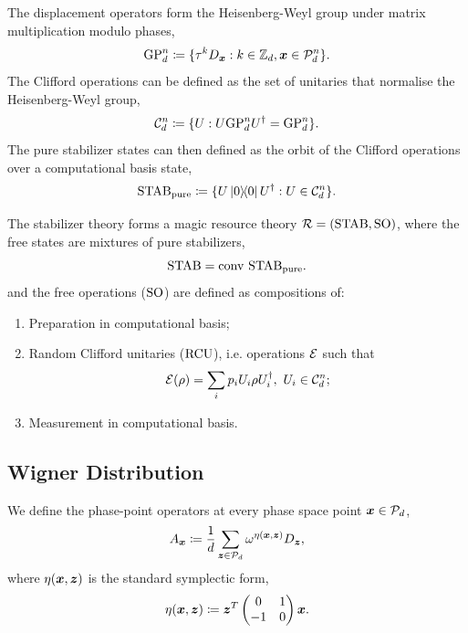 \documentclass[pra,
aps,
twocolumn,
superscriptaddress,
groupedaddress,
nofootinbib,
reprint
]{revtex4-1}
\begin{document}
The displacement operators form the Heisenberg-Weyl group  under matrix multiplication modulo phases,
\begin{equation}\label{eq:gp}
    {\rm{GP}}_d^n \coloneqq \{ \tau^k D_{\bmx}: k \in \mathbb{Z}_d, \bmx \in \cal{P}_d^n\}.
\end{equation}
The Clifford operations can be defined as the set of unitaries that normalise the Heisenberg-Weyl group,
\begin{equation}
    \cal{C}_d^n \coloneqq \{ U: U {\rm{GP}}_d^n U^\dagger = {\rm{GP}}_d^n \}.
\end{equation}
The pure stabilizer states can then defined as the orbit of the Clifford operations over a computational basis state,
\begin{equation}\label{eq:stab}
    \stab_{{\rm{pure}}} \coloneqq \{ U\ketbra{0}{0}U^\dagger: U \in \cal{C}_d^n\}.
\end{equation}

The stabilizer theory forms a magic resource theory $\R = (\stab, \so)$, where the free states are mixtures of pure stabilizers,
\begin{equation}
    \stab = \conv\ \stab_{{\rm{pure}}}.
\end{equation}
and the free operations ($\so$) are defined as compositions of:
\begin{enumerate}
    \item Preparation in computational basis;
    \item Random Clifford unitaries ($\rcu$), i.e. operations $\E$ such that 
    \begin{equation}
        \E(\rho) = \sum_i p_i U_i \rho U_i^\dagger,\ U_i \in \cal{C}_d^n;
\end{equation}
    \item Measurement in computational basis.
\end{enumerate}

\subsection{Wigner Distribution}\label{sec:wigner}

We define the phase-point operators at every phase space point $\bmx \in \cal{P}_d$,
\begin{align}
	A_{\bmx} \coloneqq \frac{1}{d} \sum_{\bmz \in \cal{P}_d} \omega^{\eta(\bmx, \bmz)} D_{\bmz}, \label{eq:ax}
\end{align}
where $\eta(\bmx, \bmz)$ is the standard symplectic form,
\begin{equation}
	\eta(\bmx, \bmz) \coloneqq \bmz^T \begin{pmatrix}
		0  & 1 \\ %
		-1 & 0 \\ %
	\end{pmatrix} \bmx.
\end{equation}
\end{document}
